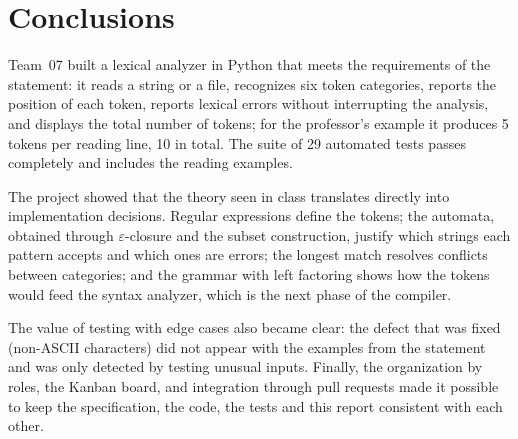 \documentclass[11pt,letterpaper]{article}
\begin{document}
\section{Conclusions}

Team~07 built a lexical analyzer in Python that meets the requirements of the
statement: it reads a string or a file, recognizes six token categories,
reports the position of each token, reports lexical errors without
interrupting the analysis, and displays the total number of tokens; for the
professor's example it produces 5 tokens per reading line, 10 in total. The suite of 29
automated tests passes completely and includes the reading examples.

The project showed that the theory seen in class translates directly into
implementation decisions. Regular expressions define the tokens; the
automata, obtained through $\varepsilon$-closure and the subset construction,
justify which strings each pattern accepts and which ones are errors; the
longest match resolves conflicts between categories; and the grammar with left
factoring shows how the tokens would feed the syntax analyzer, which is the
next phase of the compiler.

The value of testing with edge cases also became clear: the defect that was
fixed (non-ASCII characters) did not appear with the examples from the
statement and was only detected by testing unusual inputs. Finally,
the organization by roles, the Kanban board, and integration through pull
requests made it possible to keep the specification, the code, the tests and
this report consistent with each other.
\end{document}
